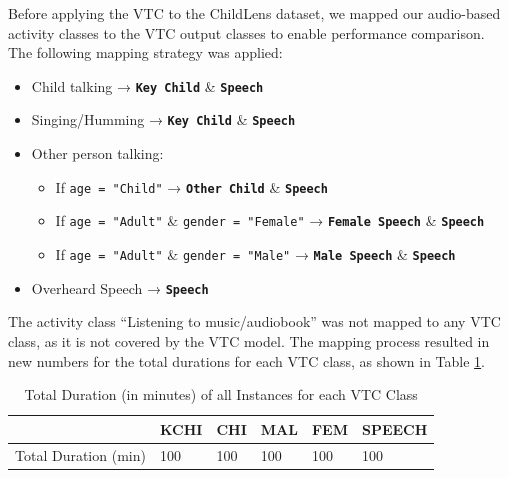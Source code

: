 \documentclass[
  man,floatsintext]{apa6}
\providecommand{\tightlist}{%
  \setlength{\itemsep}{0pt}\setlength{\parskip}{0pt}}
\begin{document}
Before applying the VTC to the ChildLens dataset, we mapped our audio-based activity classes to the VTC output classes to enable performance comparison. The following mapping strategy was applied:

\begin{itemize}
\tightlist
\item
  Child talking → \textbf{\texttt{Key\ Child}} \& \textbf{\texttt{Speech}}
\item
  Singing/Humming → \textbf{\texttt{Key\ Child}} \& \textbf{\texttt{Speech}}
\item
  Other person talking:

  \begin{itemize}
  \tightlist
  \item
    If \texttt{age\ =\ "Child"} → \textbf{\texttt{Other\ Child}} \& \textbf{\texttt{Speech}}
  \item
    If \texttt{age\ =\ "Adult"} \& \texttt{gender\ =\ "Female"} → \textbf{\texttt{Female\ Speech}} \& \textbf{\texttt{Speech}}
  \item
    If \texttt{age\ =\ "Adult"} \& \texttt{gender\ =\ "Male"} → \textbf{\texttt{Male\ Speech}} \& \textbf{\texttt{Speech}}
  \end{itemize}
\item
  Overheard Speech → \textbf{\texttt{Speech}}
\end{itemize}

The activity class ``Listening to music/audiobook'' was not mapped to any VTC class, as it is not covered by the VTC model. The mapping process resulted in new numbers for the total durations for each VTC class, as shown in Table \ref{tab:vtc-classes-statistics}.

\begin{table}[tbp]

\begin{center}
\begin{threeparttable}

\caption{\label{tab:vtc-classes-statistics}Total Duration (in minutes) of all Instances for each VTC Class}

\begin{tabular}{llllll}
\toprule
 & \multicolumn{1}{c}{KCHI} & \multicolumn{1}{c}{CHI} & \multicolumn{1}{c}{MAL} & \multicolumn{1}{c}{FEM} & \multicolumn{1}{c}{SPEECH}\\
\midrule
Total Duration (min) & 100 & 100 & 100 & 100 & 100\\
\bottomrule
\end{tabular}

\end{threeparttable}
\end{center}

\end{table}
\end{document}
